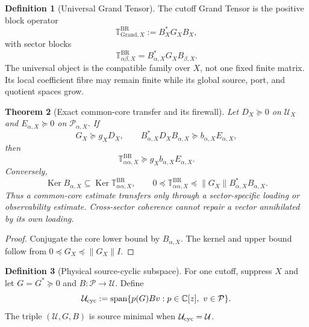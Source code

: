\documentclass[11pt]{article}
\newtheorem{theorem}{Theorem}[section]
\theoremstyle{definition}
\newtheorem{definition}[theorem]{Definition}
\theoremstyle{remark}
\newcommand{\C}{\mathbb C}
\newcommand{\norm}[1]{\lVert#1\rVert}
\newcommand{\Span}{\operatorname{span}}
\newcommand{\Ker}{\operatorname{Ker}}
\newcommand{\Grand}{\mathrm{Grand}}
\newcommand{\BR}{\mathrm{BR}}
\begin{document}
\begin{definition}[Universal Grand Tensor]
\label{def:grand-tensor-master}
The cutoff Grand Tensor is the positive block operator
\[
 \boxed{
 \boldsymbol{\mathbb T}_{\Grand,X}^{\BR}
 :=B_X^*G_XB_X,}
\]
with sector blocks
\[
 \boxed{
 \mathbb T_{\alpha\beta,X}^{\BR}
 =B_{\alpha,X}^*G_XB_{\beta,X}.}
\]
The universal object is the compatible family over $X$, not one fixed finite
matrix.  Its local coefficient fibre may remain finite while its global
source, port, and quotient spaces grow.
\end{definition}

\begin{theorem}[Exact common-core transfer and its firewall]
\label{thm:grand-core-transfer}
Let $D_X\succeq0$ on $\mathcal U_X$ and
$E_{\alpha,X}\succeq0$ on $\mathcal P_{\alpha,X}$.  If
\[
 G_X\succeq g_XD_X,
 \qquad
 B_{\alpha,X}^*D_XB_{\alpha,X}
 \succeq b_{\alpha,X}E_{\alpha,X},
\]
then
\[
 \boxed{
 \mathbb T_{\alpha\alpha,X}^{\BR}
 \succeq g_Xb_{\alpha,X}E_{\alpha,X}.}
\]
Conversely,
\[
 \Ker B_{\alpha,X}\subseteq
 \Ker\mathbb T_{\alpha\alpha,X}^{\BR},
 \qquad
 0\preceq\mathbb T_{\alpha\alpha,X}^{\BR}
 \preceq\norm{G_X}B_{\alpha,X}^*B_{\alpha,X}.
\]
Thus a common-core estimate transfers only through a sector-specific loading
or observability estimate.  Cross-sector coherence cannot repair a vector
annihilated by its own loading.
\end{theorem}

\begin{proof}
Conjugate the core lower bound by $B_{\alpha,X}$.  The kernel and upper bound
follow from $0\preceq G_X\preceq\norm{G_X}I$.
\end{proof}

\begin{definition}[Physical source-cyclic subspace]
For one cutoff, suppress $X$ and let $G=G^*\succeq0$ and
$B:\mathcal P\to\mathcal U$.  Define
\[
 \mathcal U_{\rm cyc}
 :=\Span\{p(G)Bv:p\in\C[z],\ v\in\mathcal P\}.
\]
The triple $(\mathcal U,G,B)$ is source minimal when
$\mathcal U_{\rm cyc}=\mathcal U$.
\end{definition}
\end{document}
